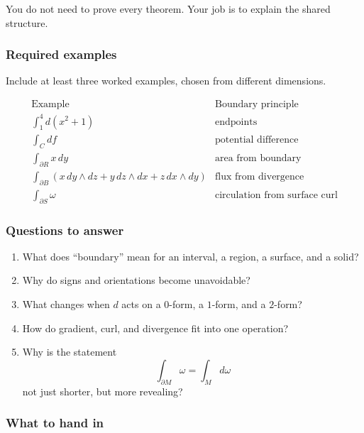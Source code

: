 You do not need to prove every theorem.  Your job is to explain the shared structure.

\subsubsection*{Required examples}

Include at least three worked examples, chosen from different dimensions.

\[
\begin{array}{c|c}
\text{Example} & \text{Boundary principle} \\ \hline
\displaystyle \int_1^4 d(x^2+1)
&
\text{endpoints}\\[2mm]
\displaystyle \int_C df
&
\text{potential difference}\\[2mm]
\displaystyle \int_{\partial R}x\,dy
&
\text{area from boundary}\\[2mm]
\displaystyle \int_{\partial B}
\left(x\,dy\wedge dz+y\,dz\wedge dx+z\,dx\wedge dy\right)
&
\text{flux from divergence}\\[3mm]
\displaystyle \int_{\partial S}\omega
&
\text{circulation from surface curl}
\end{array}
\]

\subsubsection*{Questions to answer}

\begin{enumerate}
\item What does ``boundary'' mean for an interval, a region, a surface, and a solid?

\item Why do signs and orientations become unavoidable?

\item What changes when \(d\) acts on a \(0\)-form, a \(1\)-form, and a \(2\)-form?

\item How do gradient, curl, and divergence fit into one operation?

\item Why is the statement
\[
    \int_{\partial M}\omega=\int_Md\omega
\]
not just shorter, but more revealing?
\end{enumerate}

\subsubsection*{What to hand in}

